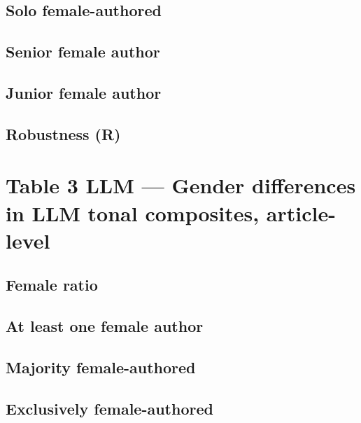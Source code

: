 \documentclass[12pt]{article}
\begin{document}
\subsection{Solo female-authored}

\clearpage

\subsection{Senior female author}

\clearpage

\subsection{Junior female author}

\clearpage

\subsection{Robustness (R)}

\clearpage

\section{Table 3 LLM --- Gender differences in LLM tonal composites, article-level}

\subsection{Female ratio}

\clearpage

\subsection{At least one female author}

\clearpage

\subsection{Majority female-authored}

\clearpage

\subsection{Exclusively female-authored}

\clearpage
\end{document}
